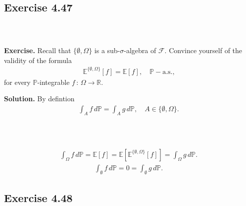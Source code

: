 \documentclass{beamer}
\numberwithin{equation}{section}
\newenvironment{frame2}{\begin{frame}\frametitle{{\normalsize \secname} \\ {\large \subsecname}}}{\end{frame}}
\begin{document}
\subsection{Exercise 4.47}

\begin{frame2}
    \textbf{Exercise.}
    Recall that $\{\emptyset,\Omega\}$ is a sub-$\sigma$-algebra of $\mathcal{F}$.
    Convince yourself of the validity of the formula
    \begin{align}
        \mathbb{E}^{\{\emptyset,\Omega\}}[f] = \mathbb{E}[f],\quad \mathbb{P}-\text{a.s.,}
    \end{align}
    for every $\mathbb{P}$-integrable $f \, : \, \Omega \rightarrow \mathbb{R}$.

    \vspace{10pt}
    \textbf{Solution.}
    By defintion
    \begin{align}
        \int_Af\, d\mathbb{P} = \int_Ag\, d\mathbb{P}, \quad A \in \{\emptyset,\Omega\}.
    \end{align}
\end{frame2}

\begin{frame2}
    \begin{align}
        \int_\Omega f\, d\mathbb{P} = \mathbb{E}\left[f\right] = \mathbb{E}\left[\mathbb{E}^{\{\emptyset,\Omega\}}\left[f\right]\right] = \int_\Omega g\, d\mathbb{P}.
    \end{align}
    \begin{align}
        \int_\emptyset f\, d\mathbb{P} = 0 = \int_\emptyset g\, d\mathbb{P}.
    \end{align}
\end{frame2}

\subsection{Exercise 4.48}
\end{document}
